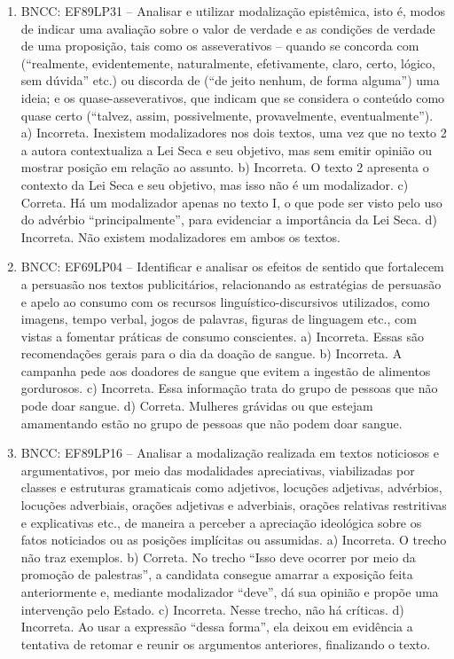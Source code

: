 \begin{enumerate}
\item
BNCC: EF89LP31 -- Analisar e utilizar modalização epistêmica, isto é,
modos de indicar uma avaliação sobre o valor de verdade e as condições
de verdade de uma proposição, tais como os asseverativos -- quando se
concorda com (``realmente, evidentemente, naturalmente, efetivamente,
claro, certo, lógico, sem dúvida'' etc.) ou discorda de (``de jeito
nenhum, de forma alguma'') uma ideia; e os quase-asseverativos, que
indicam que se considera o conteúdo como quase certo (``talvez, assim,
possivelmente, provavelmente, eventualmente'').
 a) Incorreta. Inexistem modalizadores nos dois textos, uma vez que no texto 2 a autora contextualiza a Lei Seca e seu objetivo, mas sem emitir opinião ou mostrar posição em relação ao assunto. b) Incorreta. O texto 2 apresenta o contexto da Lei Seca e seu objetivo, mas isso não é um modalizador. c) Correta. Há um modalizador apenas no texto I, o que pode ser visto pelo uso do advérbio ``principalmente'', para evidenciar a importância da Lei Seca. d) Incorreta. Não existem modalizadores em ambos os textos.

\item
BNCC: EF69LP04 -- Identificar e analisar os efeitos de sentido que
 fortalecem a persuasão nos textos publicitários, relacionando as estratégias de persuasão e apelo ao consumo com os recursos linguístico-discursivos utilizados, como imagens, tempo verbal, jogos de palavras, figuras de linguagem etc., com vistas a fomentar práticas de consumo conscientes. a) Incorreta. Essas são recomendações gerais para o dia da doação de sangue. b) Incorreta. A campanha pede aos doadores de sangue que evitem a ingestão de alimentos gordurosos. c) Incorreta. Essa informação trata do grupo de pessoas que não pode doar sangue. d) Correta. Mulheres grávidas ou que estejam amamentando estão no grupo de pessoas que não podem doar sangue.

\item
BNCC: EF89LP16 -- Analisar a modalização realizada em textos noticiosos
e argumentativos, por meio das modalidades apreciativas, viabilizadas
por classes e estruturas gramaticais como adjetivos, locuções adjetivas,
advérbios, locuções adverbiais, orações adjetivas e adverbiais, orações
relativas restritivas e explicativas etc., de maneira a perceber a
apreciação ideológica sobre os fatos noticiados ou as posições
implícitas ou assumidas. a) Incorreta. O trecho não traz exemplos. b) Correta. No trecho ``Isso deve ocorrer por meio da promoção de palestras'', a candidata consegue amarrar a exposição feita anteriormente e, mediante modalizador ``deve'', dá sua opinião e propõe uma intervenção pelo Estado. c) Incorreta. Nesse trecho, não há críticas. d) Incorreta. Ao usar a expressão ``dessa forma'', ela deixou em evidência a tentativa de retomar e reunir os argumentos anteriores, finalizando o texto.
\end{enumerate}

